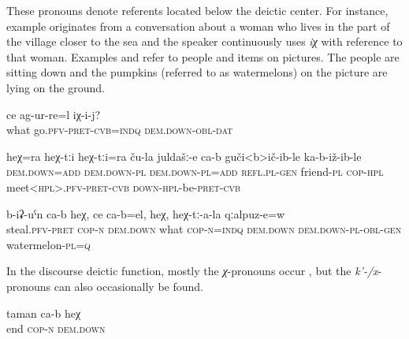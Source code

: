 These pronouns denote referents located below the deictic center. For instance, example  originates from a conversation about a woman who lives in the part of the village closer to the sea and the speaker continuously uses \textit{iχ} with reference to that woman. Examples  and  refer to people and items on pictures. The people are sitting down and the pumpkins (referred to as watermelons) on the picture are lying on the ground.
%
\begin{exe}
	\ex	\label{What happened to her?}
	\gll	ce	ag-ur-re=l	iχ-i-j?\\
		what	go.\textsc{pfv-pret-cvb}=\textsc{indq}	\textsc{dem.down}-\textsc{obl}-\textsc{dat}\\
	\glt	{}

	\ex	\label{He and they, his friends also meet and sit together.}
	\gll	heχ=ra	heχ-tːi	heχ-tːi=ra	ču-la	juldašː-e	ca-b	guči<b>ič-ib-le	ka-b-iž-ib-le\\
		\textsc{dem.down}=\textsc{add}	\textsc{dem.down}-\textsc{pl}	\textsc{dem.down}-\textsc{pl}=\textsc{add}	\textsc{refl}.\textsc{pl}-\textsc{gen}	friend-\textsc{pl}	\textsc{cop-hpl}	meet<\textsc{hpl}>.\textsc{pfv-pret-cvb}	\textsc{down}-\textsc{hpl}-be-\textsc{pret}-\textsc{cvb}\\
	\glt	{}

	\ex	\label{(They) stole it, whatever it is, this, their watermelons.}
	\gll	b-iʡ-uˁn ca-b	heχ,	ce	ca-b=el,	heχ,	heχ-tː-a-la	qːalpuz-e=w \\
		steal.\textsc{pfv}-\textsc{pret} \textsc{cop-n}	\textsc{dem.down}	what	\textsc{cop-n}=\textsc{indq}	\textsc{dem.down}	\textsc{dem.down}-\textsc{pl}-\textsc{obl}-\textsc{gen}	watermelon-\textsc{pl}=\textsc{q}\\
	\glt	{}
\end{exe}

In the discourse deictic function, mostly the \textit{χ}-pronouns occur , but the \textit{k'-/x}-pronouns can also occasionally be found.

\begin{exe}
	\ex	\label{This is the end (of the story).}
	\gll	taman	ca-b	heχ \\
		end	\textsc{cop-n}	\textsc{dem.down}\\
	\glt	{}
\end{exe}


